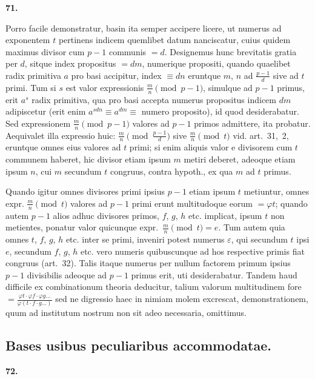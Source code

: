 \documentclass[12pt,a4paper]{article}
\theoremstyle{plain}
\theoremstyle{definition}
\theoremstyle{remark}
\begin{document}
\setcounter{satz}{71}
\addtocounter{satz}{-1}
\textbf{71.}

Porro facile demonstratur, basin ita semper accipere licere, ut numerus ad exponentem $t$ pertinens indicem quemlibet datum nanciscatur, cuius quidem maximus divisor cum $p-1$ communis $=d$. Designemus hunc brevitatis gratia per $d$, sitque index propositus $= dm$, numerique propositi, quando quaelibet radix primitiva $a$ pro basi accipitur, index $\equiv dn$ eruntque $m$, $n$ ad $\frac{p-1}{d}$ sive ad $t$ primi. Tum si $s$ est valor expressionis $\frac{m}{n} \pmod{p-1}$, simulque ad $p-1$ primus, erit $a^s$ radix primitiva, qua pro basi accepta numerus propositus indicem $dm$ adipiscetur (erit enim $a^{sdn} \equiv a^{dm} \equiv$ numero proposito), id quod desiderabatur. Sed expressionem $\frac{m}{n} \pmod{p-1}$ valores ad $p-1$ primos admittere, ita probatur. Aequivalet illa expressio huic: $\frac{m}{n} \pmod{\frac{p-1}{d}}$ sive $\frac{m}{n} \pmod{t}$ vid. art.~31,~2, eruntque omnes eius valores ad $t$ primi; si enim aliquis valor e divisorem cum $t$ communem haberet, hic divisor etiam ipsum $m$ metiri deberet, adeoque etiam ipsum $n$, cui $m$ secundum $t$ congruus, contra hypoth., ex qua $m$ ad $t$ primus.

Quando igitur omnes divisores primi ipsius $p-1$ etiam ipsum $t$ metiuntur, omnes expr. $\frac{m}{n} \pmod{t}$ valores ad $p-1$ primi erunt multitudoque eorum $=\varphi t$; quando autem $p-1$ alios adhuc divisores primos, $f$, $g$, $h$ etc. implicat, ipsum $t$ non metientes, ponatur valor quicunque expr.~$\frac{m}{n} \pmod{t} = e$. Tum autem quia omnes $t$, $f$, $g$, $h$ etc. inter se primi, inveniri potest numerus $\varepsilon$, qui secundum $t$ ipsi $e$, secundum $f$, $g$, $h$ etc. vero numeris quibuscunque ad hos respective primis fiat congruus (art.~32). Talis itaque numerus per nullum factorem primum ipsius $p-1$ divisibilis adeoque ad $p-1$ primus erit, uti desiderabatur. Tandem haud difficile ex combinationum theoria deducitur, talium valorum multitudinem fore $= \frac{\varphi t \cdot \varphi f \cdot \varphi g \ldots}{\varphi(t \cdot f \cdot g \ldots)}$ sed ne digressio haec in nimiam molem excrescat, demonstrationem, quum ad institutum nostrum non sit adeo necessaria, omittimus.


\subsection*{Bases usibus peculiaribus accommodatae.}

\setcounter{satz}{72}
\addtocounter{satz}{-1}
\textbf{72.}
\end{document}
